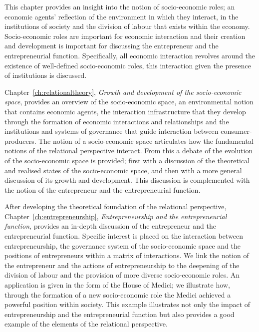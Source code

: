 This chapter provides an insight into the notion of socio-economic roles; an economic agents' reflection of the environment in which they interact, in the institutions of society and the division of labour that exists within the economy. Socio-economic roles are important for economic interaction and their creation and development is important for discussing the entrepreneur and the entrepreneurial function. Specifically, all economic interaction revolves around the existence of well-defined socio-economic roles, this interaction given the presence of institutions is discussed.

Chapter~\ref{ch:relationaltheory}, \emph{Growth and development of the socio-economic space}, provides an overview of the socio-economic space, an environmental notion that contains economic agents, the interaction infrastructure that they develop through the formation of economic interactions and relationships and the institutions and systems of governance that guide interaction between consumer-producers. The notion of a socio-economic space articulates how the fundamental notions of the relational perspective interact. From this a debate of the evolution of the socio-economic space is provided; first with a discussion of the theoretical and realised states of the socio-economic space, and then with a more general discussion of its growth and development. This discussion is complemented with the notion of the entrepreneur and the entrepreneurial function.

After developing the theoretical foundation of the relational perspective, Chapter~\ref{ch:entrepreneurship}, \emph{Entrepreneurship and the entrepreneurial function}, provides an in-depth discussion of the entrepreneur and the entrepreneurial function. Specific interest is placed on the interaction between entrepreneurship, the governance system of the socio-economic space and the positions of entrepreneurs within a matrix of interactions. We link the notion of the entrepreneur and the actions of entrepreneurship to the deepening of the division of labour and the provision of more diverse socio-economic roles. An application is given in the form of the House of Medici; we illustrate how, through the formation of a new socio-economic role the Medici achieved a powerful position within society. This example illustrates not only the impact of entrepreneurship and the entrepreneurial function but also provides a good example of the elements of the relational perspective.
